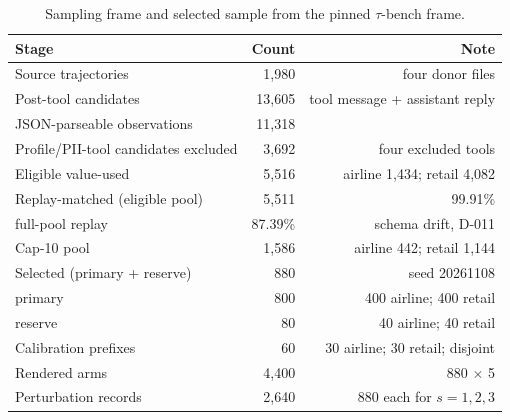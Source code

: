 \documentclass[a4paper,fleqn]{cas-sc}
\begin{document}
\setcounter{table}{0}
\renewcommand{\thetable}{S\arabic{table}}

\begin{table}[pos=htbp]
  \centering
  \caption{Sampling frame and selected sample from the pinned $\tau$-bench frame.}
  \label{tab:supply}
  \small
  \begin{tabular}{>{\raggedright\arraybackslash}p{6.6cm}rr}
    \toprule
    \textbf{Stage} & \textbf{Count} & \textbf{Note} \\
    \midrule
    Source trajectories                 & 1{,}980 & four donor files \\
    Post-tool candidates                & 13{,}605 & tool message + assistant reply \\
    JSON-parseable observations         & 11{,}318 & \\
    Profile/PII-tool candidates excluded & 3{,}692 & four excluded tools \\
    Eligible value-used                 & 5{,}516 & airline 1{,}434; retail 4{,}082 \\
    Replay-matched (eligible pool)      & 5{,}511 & 99.91\% \\
    \quad full-pool replay              & 87.39\% & schema drift, D-011 \\
    Cap-10 pool                         & 1{,}586 & airline 442; retail 1{,}144 \\
    Selected (primary + reserve)        & 880 & seed 20261108 \\
    \quad primary                       & 800 & 400 airline; 400 retail \\
    \quad reserve                       & 80 & 40 airline; 40 retail \\
    Calibration prefixes                & 60 & 30 airline; 30 retail; disjoint \\
    Rendered arms                       & 4{,}400 & 880 $\times$ 5 \\
    Perturbation records                & 2{,}640 & 880 each for $s=1,2,3$ \\
    \bottomrule
  \end{tabular}
\end{table}
\end{document}
